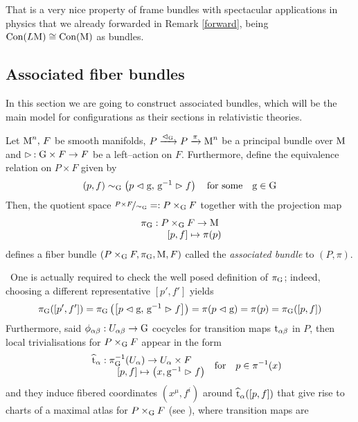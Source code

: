 That is a very nice property of frame bundles with spectacular applications in physics that we already forwarded in Remark \ref{forward}, being $\text{\normalfont Con}(L\text{\normalfont M})\cong\text{\normalfont Con}(\text{\normalfont M})$ as bundles.


\subsection{Associated fiber bundles}

In this section we are going to construct associated bundles, which will be the main model for configurations as their sections in relativistic theories.

\begin{defi}
    Let $\text{\normalfont M}^n,\,F$ be smooth manifolds, $P\xrightarrow[]{\vartriangleleft_{\text{\normalfont G}}}P\xrightarrow{\pi}\text{\normalfont M}^n$ be a principal bundle over $\text{\normalfont M}$ and $\vartriangleright\,:\text{\normalfont G}\times F\to F$ be a left--action on $F$. Furthermore, define the equivalence relation on $P\times F$ given by
    $$(p,f)\sim_{\text{\normalfont G}}\left(p\vartriangleleft\text{\normalfont g},\,\text{\normalfont g}^{-1}\vartriangleright f\right)\quad\text{for some}\quad\text{\normalfont g}\in\text{\normalfont G}$$
    Then, the quotient space $\nicefrac{P\times F}{\sim_{\text{\normalfont G}}}=:P\times_{\text{\normalfont G}} F$ together with the projection map
    $$\begin{matrix}
        \pi_{\text{\normalfont G}}:P\times_{\text{\normalfont G}} F\to\text{\normalfont M}\\
        \qquad\quad[p,f]\mapsto\pi(p)
    \end{matrix}$$
    defines a fiber bundle $(P\times_{\text{\normalfont G}} F,\pi_{\text{\normalfont G}},\text{\normalfont M},F)$ called the \emph{associated bundle} to $(P,\pi)$.
\end{defi}
\,\newline
One is actually required to check the well posed definition of $\pi_{\text{\normalfont G}}$; indeed, choosing a different representative $[p',f']$ yields
$$\pi_{\text{\normalfont G}}([p',f'])=\pi_{\text{\normalfont G}}\left(\left[p\vartriangleleft\text{\normalfont g},\,\text{\normalfont g}^{-1}\vartriangleright f\right]\right)=\pi(p\vartriangleleft\text{\normalfont g})=\pi(p)=\pi_{\text{\normalfont G}}([p,f])$$
Furthermore, said $\phi_{\alpha\beta}:U_{\alpha\beta}\to\text{\normalfont G}$ cocycles for transition maps $\text{\normalfont t}_{\alpha\beta}$ in $P$, then local trivialisations for $P\times_{\text{\normalfont G}} F$ appear in the form
$$\begin{matrix}
    \widehat{\text{\normalfont t}}_{\alpha}:\pi^{-1}_{\text{\normalfont G}}(U_\alpha)\to U_{\alpha}\times F\\
    \qquad\qquad[p,f]\mapsto\left(x,\text{\normalfont g}^{-1}\vartriangleright f\right)
\end{matrix}\quad\text{for}\quad p\in\pi^{-1}(x)$$
and they induce fibered coordinates $(x^\mu,f^i)$ around $\widehat{\text{\normalfont t}}_\alpha([p,f])$ that give rise to charts of a maximal atlas for $P\times_{\text{\normalfont G}} F$ (see \cite{princ1}), where transition maps are

